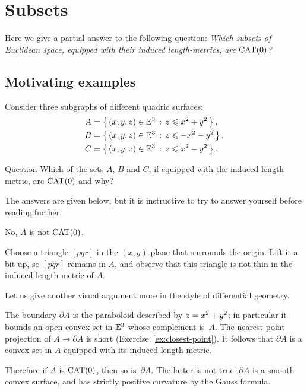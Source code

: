 \chapter{Subsets}\label{chapter:shefel}

Here we give a partial answer to the following question:
\textit{Which subsets of Euclidean space, equipped with their induced length-metrics, are  $\mathrm{CAT}(0)$?}

\section{Motivating examples}\label{sec:solid-parabolonds}

Consider three subgraphs of different quadric surfaces:
\begin{align*}
A&=\left\{\,{(x,y,z)\in\mathbb{E}^3}\,:\,{z\leqslant x^2+y^2}\,\right\},
\\
B&=\left\{\,{(x,y,z)\in\mathbb{E}^3}\,:\,{z\leqslant -x^2-y^2}\,\right\},
\\
C&=\left\{\,{(x,y,z)\in\mathbb{E}^3}\,:\,{z\leqslant x^2-y^2}\,\right\}.
\end{align*}

\begin{thm}{Question}\label{CAT(0)?}
Which of the sets $A$, $B$ and $C$, if equipped with the induced length metric, are $\mathrm{CAT}(0)$ and why?
\end{thm}

The answers are given below, but it is instructive to try to answer yourself before reading further.

No, $A$ is not $\mathrm{CAT}(0)$.

Choose a triangle $[pqr]$ in the $(x,y)$-plane that surrounds the origin.
Lift it a bit up, so $[pqr]$ remains in $A$, and observe that this triangle is not thin in the induced length metric of $A$.
\qeds

Let us give another visual argument more in the style of  differential geometry.
 
 The boundary $\partial A$ is the paraboloid described by  $z\z=x^2+y^2$;  in particular it bounds an open convex set in $\mathbb{E}^3$ whose complement is~$A$.
The nearest-point projection of $A\to\partial A$ is short (Exercise~\ref{ex:closest-point}).
It follows that $\partial A$ is a convex set in $A$ equipped with its induced length metric.

Therefore if $A$ is $\mathrm{CAT}(0)$, then so is~$\partial A$.
The latter is not true: $\partial A$ is a smooth convex surface, and has strictly positive curvature by the Gauss formula.
\qeds

